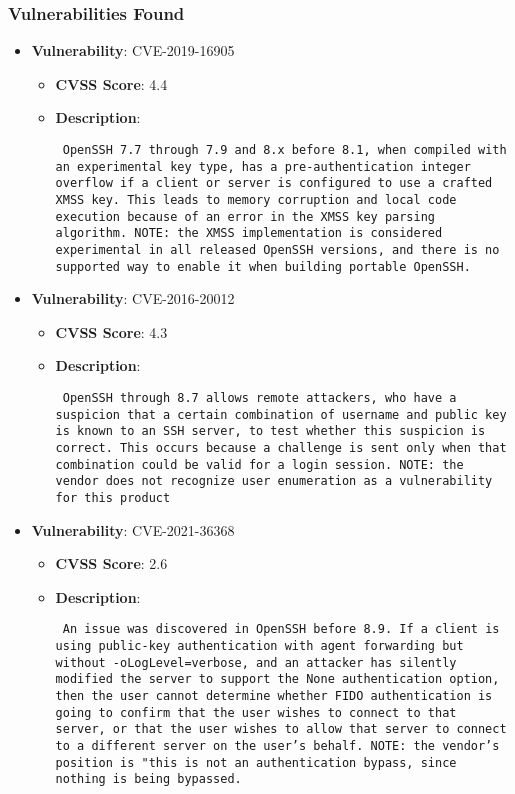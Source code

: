 \documentclass{article}
\begin{document}
\subsubsection*{Vulnerabilities Found}

\begin{itemize}
    
        \item \textbf{Vulnerability}: CVE-2019-16905
        \begin{itemize}
            \item \textbf{CVSS Score}:  4.4 
            \item \textbf{Description}: \parbox{\linewidth}{\texttt{ OpenSSH 7.7 through 7.9 and 8.x before 8.1, when compiled with an experimental key type, has a pre-authentication integer overflow if a client or server is configured to use a crafted XMSS key. This leads to memory corruption and local code execution because of an error in the XMSS key parsing algorithm. NOTE: the XMSS implementation is considered experimental in all released OpenSSH versions, and there is no supported way to enable it when building portable OpenSSH. }}
        \end{itemize}
    
        \item \textbf{Vulnerability}: CVE-2016-20012
        \begin{itemize}
            \item \textbf{CVSS Score}:  4.3 
            \item \textbf{Description}: \parbox{\linewidth}{\texttt{ OpenSSH through 8.7 allows remote attackers, who have a suspicion that a certain combination of username and public key is known to an SSH server, to test whether this suspicion is correct. This occurs because a challenge is sent only when that combination could be valid for a login session. NOTE: the vendor does not recognize user enumeration as a vulnerability for this product }}
        \end{itemize}
    
        \item \textbf{Vulnerability}: CVE-2021-36368
        \begin{itemize}
            \item \textbf{CVSS Score}:  2.6 
            \item \textbf{Description}: \parbox{\linewidth}{\texttt{ An issue was discovered in OpenSSH before 8.9. If a client is using public-key authentication with agent forwarding but without -oLogLevel=verbose, and an attacker has silently modified the server to support the None authentication option, then the user cannot determine whether FIDO authentication is going to confirm that the user wishes to connect to that server, or that the user wishes to allow that server to connect to a different server on the user's behalf. NOTE: the vendor's position is "this is not an authentication bypass, since nothing is being bypassed. }}
        \end{itemize}
    

\end{itemize}
\end{document}
